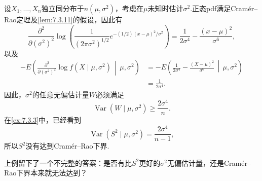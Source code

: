 \begin{example}[正态方差的下界]\label{ex:7.3.14}
设$X_1,\ldots,X_n$独立同分布于$n(\mu,\sigma^2)$，考虑在$\mu$未知时估计$\sigma^2$.正态pdf满足Cramér--Rao定理及\autoref{lem:7.3.11}的假设，因此有
$$\frac{\partial^2}{\partial(\sigma^2)^2}\log\left(\frac1{(2\pi\sigma^2)^{1/2}}e^{-(1/2)(x-\mu)^2/\sigma^2}\right)=\frac1{2\sigma^4}-\frac{(x-\mu)^2}{\sigma^6},$$
以及
\begin{align*}
-E\left(\frac{\partial^2}{\partial(\sigma^2)^2}\log f(X\mid\mu,\sigma^2)\,\middle|\,\mu,\sigma^2\right)
&=-E\left(\frac1{2\sigma^4}-\frac{(X-\mu)^2}{\sigma^6}\,\middle|\,\mu,\sigma^2\right)\\
&=\frac1{2\sigma^4}.
\end{align*}
因此，$\sigma^2$的任意无偏估计量$W$必须满足
$$\operatorname{Var}(W\mid\mu,\sigma^2)\ge\frac{2\sigma^4}n.$$
在\autoref{ex:7.3.3}中，已经看到
$$\operatorname{Var}(S^2\mid\mu,\sigma^2)=\frac{2\sigma^4}{n-1},$$
所以$S^2$没有达到Cramér--Rao下界.
\end{example}
上例留下了一个不完整的答案：是否有比$S^2$更好的$\sigma^2$无偏估计量，还是Cramér--Rao下界本来就无法达到？

